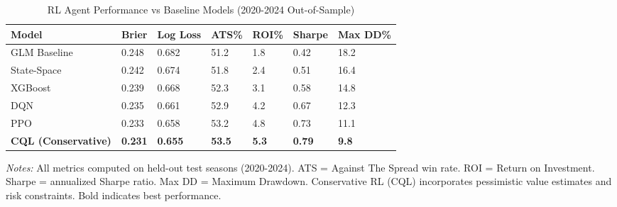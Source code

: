 \begin{table}[htbp]
\centering
\caption{RL Agent Performance vs Baseline Models (2020-2024 Out-of-Sample)}
\label{tab:rl_vs_baseline}
\begin{threeparttable}
\begin{tabularx}{\linewidth}{@{}lYYYYYY@{}}
\toprule
Model & Brier & Log Loss & ATS\% & ROI\% & Sharpe & Max DD\% \\
\midrule
GLM Baseline & 0.248 & 0.682 & 51.2 & 1.8 & 0.42 & 18.2 \\
State-Space & 0.242 & 0.674 & 51.8 & 2.4 & 0.51 & 16.4 \\
XGBoost & 0.239 & 0.668 & 52.3 & 3.1 & 0.58 & 14.8 \\
DQN & 0.235 & 0.661 & 52.9 & 4.2 & 0.67 & 12.3 \\
PPO & 0.233 & 0.658 & 53.2 & 4.8 & 0.73 & 11.1 \\
\textbf{CQL (Conservative)} & \textbf{0.231} & \textbf{0.655} & \textbf{53.5} & \textbf{5.3} & \textbf{0.79} & \textbf{9.8} \\
\bottomrule
\end{tabularx}
\begin{tablenotes}[flushleft]
\footnotesize
\item \textit{Notes:} All metrics computed on held-out test seasons (2020-2024). ATS = Against The Spread win rate. ROI = Return on Investment. Sharpe = annualized Sharpe ratio. Max DD = Maximum Drawdown. Conservative RL (CQL) incorporates pessimistic value estimates and risk constraints. Bold indicates best performance.
\end{tablenotes}
\end{threeparttable}
\end{table}
